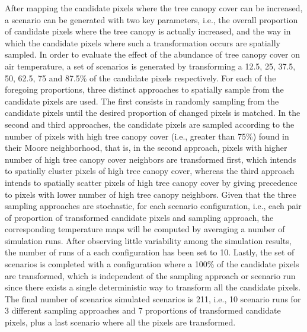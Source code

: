 \documentclass[10pt,letterpaper]{article}
\begin{document}
After mapping the candidate pixels where the tree canopy cover can be increased, a scenario can be generated with two key parameters, i.e., the overall proportion of candidate pixels where the tree canopy is actually increased, and the way in which the candidate pixels where such a transformation occurs are spatially sampled.
In order to evaluate the effect of the abundance of tree canopy cover on air temperature, a set of scenarios is generated by transforming a 12.5, 25, 37.5, 50, 62.5, 75 and 87.5\% of the candidate pixels respectively.
For each of the foregoing proportions, three distinct approaches to spatially sample from the candidate pixels are used. The first consists in randomly sampling from the candidate pixels until the desired proportion of changed pixels is matched.
In the second and third approaches, the candidate pixels are sampled according to the number of pixels with high tree canopy cover (i.e., greater than 75\%) found in their Moore neighborhood, that is, in the second approach, pixels with higher number of high tree canopy cover neighbors are transformed first, which intends to spatially cluster pixels of high tree canopy cover, whereas the third approach intends to spatially scatter pixels of high tree canopy cover by giving precedence to pixels with lower number of high tree canopy neighbors.
Given that the three sampling approaches are stochastic, for each scenario configuration, i.e., each pair of proportion of transformed candidate pixels and sampling approach, the corresponding temperature maps will be computed by averaging a number of simulation runs. 
After observing little variability among the simulation results, the number of runs of a each configuration has been set to 10.
Lastly, the set of scenarios is completed with a configuration where a 100\% of the candidate pixels are transformed, which is independent of the sampling approach or scenario run since there exists a single deterministic way to transform all the candidate pixels.
The final number of scenarios simulated scenarios is 211, i.e., 10 scenario runs for 3 different sampling approaches and 7 proportions of transformed candidate pixels, plus a last scenario where all the pixels are transformed.
\end{document}
